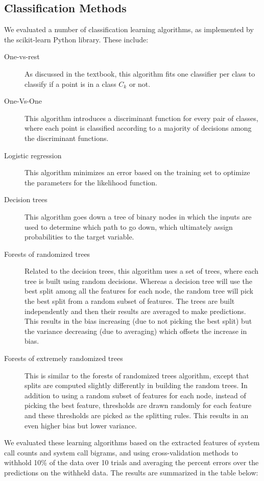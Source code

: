 \documentclass[11pt]{amsart}
\begin{document}
\subsection{Classification Methods}
We evaluated a number of classification learning algorithms, as implemented by the scikit-learn Python library. These include:
\begin{description}
  \item[One-vs-rest] As discussed in the textbook, this algorithm fits one classifier per class to classify if a point is in a class $C_k$ or not.
  \item[One-Vs-One] This algorithm introduces a discriminant function for every pair of classes, where each point is classified according to a majority of decisions among the discriminant functions.
  \item[Logistic regression] This algorithm minimizes an error based on the training set to optimize the parameters for the likelihood function.
  \item[Decision trees] This algorithm goes down a tree of binary nodes in which the inputs are used to determine which path to go down, which ultimately assign probabilities to the target variable.
  \item[Forests of randomized trees] Related to the decision trees, this algorithm uses a set of trees, where each tree is built using random decisions. Whereas a decision tree will use the best split among all the features for each node, the random tree will pick the best split from a random subset of features. The trees are built independently and then their results are averaged to make predictions. This results in the bias increasing (due to not picking the best split) but the variance decreasing (due to averaging) which offsets the increase in bias.
  \item[Forests of extremely randomized trees] This is similar to the forests of randomized trees algorithm, except that splits are computed slightly differently in building the random trees. In addition to using a random subset of features for each node, instead of picking the best feature, thresholds are drawn randomly for each feature and these thresholds are picked as the splitting rules. This results in an even higher bias but lower variance.
\end{description}

We evaluated these learning algorithms based on the extracted features of system call counts and system call bigrams, and using cross-validation methods to withhold 10\% of the data over 10 trials and averaging the percent errors over the predictions on the withheld data. The results are summarized in the table below:\\
\end{document}
